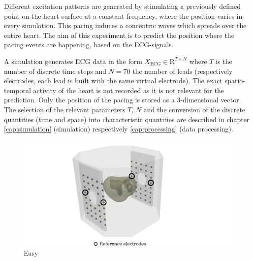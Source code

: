 Different excitation patterns are generated by stimulating a previously defined point on the heart surface at a constant frequency, where the position varies in every simulation. This pacing induces a concentric waves which spreads over the entire heart. The aim of this experiment is to predict the position where the pacing events are happening, based on the ECG-signals.

A simulation generates ECG data in the form $X_{\text{ECG}}\in\mathrm{R}^{T\times N}$ where $T$ is the number of discrete time steps and $N=70$ the number of leads (respectively electrodes, each lead is built with the same virtual electrode). The exact spatio-temporal activity of the heart is not recorded as it is not relevant for the prediction. Only the position of the pacing is stored as a 3-dimensional vector. The selection of the relevant parameters $T$, $N$ and the conversion of the discrete quantities (time and space) into characteristic quantities are described in chapter \ref{cap:simulation} (simulation) respectively \ref{cap:processing} (data processing). 



\begin{figure}[ht]
    \center
    \includegraphics[width=1.3\textwidth]{figures/heart_overview_inkscape.png}
	\caption{Easy}
	\label{fig:heart_overview}
\end{figure}




